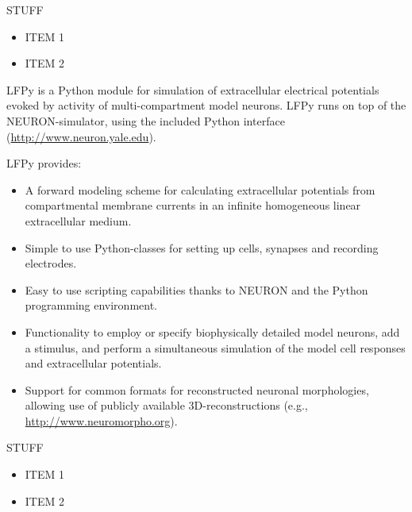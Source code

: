 \begin{multicols}{3}

STUFF

\begin{itemize}[nolistsep,topsep=0em,leftmargin=1pc]
\item ITEM 1
\item ITEM 2
\end{itemize}




LFPy is a Python module for simulation of extracellular electrical
potentials evoked by activity of multi-compartment model neurons.
LFPy runs on top of the NEURON-simulator, using the included Python interface
(\url{http://www.neuron.yale.edu}).

LFPy provides:
\begin{itemize}[nolistsep, topsep=0em, leftmargin=1pc]
\item A forward modeling scheme for calculating extracellular potentials from compartmental membrane currents in an infinite homogeneous linear extracellular medium.
\item Simple to use Python-classes for setting up cells, synapses and recording electrodes.
\item Easy to use scripting capabilities thanks to NEURON and the Python programming environment.
\item Functionality to employ or specify biophysically detailed model neurons, add a stimulus, and perform a simultaneous simulation of the model cell responses and extracellular potentials.
\item Support for common formats for reconstructed neuronal morphologies, allowing use of publicly available 3D-reconstructions (e.g., \url{http://www.neuromorpho.org}). 
\end{itemize}


%


STUFF

\begin{itemize}[nolistsep,topsep=0em,leftmargin=1pc]
\item ITEM 1
\item ITEM 2
\end{itemize}


\end{multicols}
